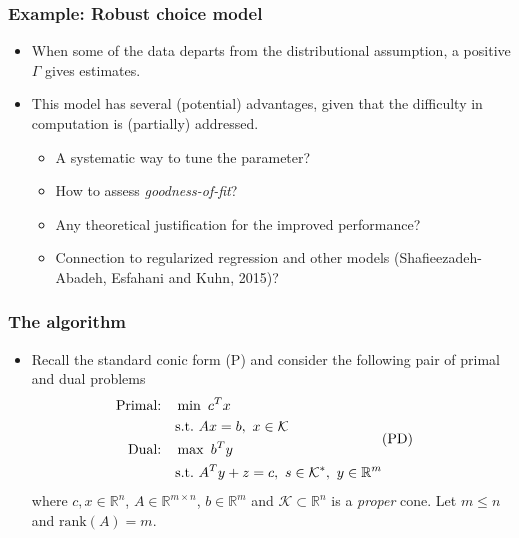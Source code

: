 \documentclass{beamer}
\begin{document}
\begin{frame}
	\frametitle{Example: Robust choice model}
	\begin{itemize}
		\item When some of the data departs from the distributional assumption, a positive $\Gamma$ gives  estimates.
		\item This model has several (potential) advantages, given that the difficulty in computation is (partially) addressed.
		\begin{itemize}
			\item A systematic way to tune the parameter?
			\item How to assess \textit{goodness-of-fit}?
			\item Any theoretical justification for the improved performance?
			\item Connection to regularized regression and other models (Shafieezadeh-Abadeh, Esfahani and Kuhn, 2015)?
		\end{itemize}
	\end{itemize}
\end{frame}

\begin{frame}
	\frametitle{The algorithm}
	\begin{itemize}
		\item Recall the standard conic form (P) and consider the following pair of primal and dual problems
		\begin{align}
		\begin{split} 
		\text{Primal:} \quad &\min\,\, c^Tx\\ 
		&\textnormal{s.t.} \,\, Ax=b,\ x\in \mathcal{K} \\
		\text{Dual:}  \quad &\max\,\, b^Ty \\
		&\textnormal{s.t.} \,\, A^Ty+z=c,\ s\in\mathcal{K}^*,\ y \in \mathbb{R}^m \\
		\end{split} &\text{(PD)} \nonumber	
		\end{align}
		where $c,x \in \mathbb{R}^n$, $A\in \mathbb{R}^{m\times n}$, $b\in \mathbb{R}^m$ and $\mathcal{K} \subset \mathbb{R}^n$ is a \textit{proper} cone. Let $m\leq n$ and $\text{rank}(A) = m$. 
	\end{itemize}
\end{frame}
\end{document}
